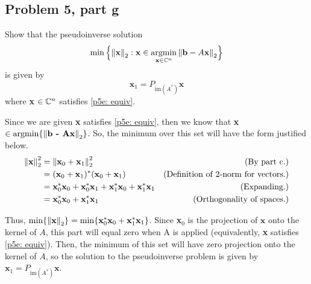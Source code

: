 \newpage
\subsection{Problem 5, part g}
Show that the pseudoinverse solution
\[
\min \Big\{ \norm{\textbf{x}}_2 : \textbf{x} \in \operatorname*{argmin}_{\textbf{x} \in \mathbb{C}^n}\norm{\textbf{b} - A\textbf{x}}_2\Big\}
\]
is given by
\[
\textbf{x}_1 = P_{\text{im}(A^*)}\textbf{x}
\]
where \textbf{x} $\in \mathbb{C}^n$ satisfies \ref{p5e: equiv}.

\partbreak
\begin{solution}

    Since we are given \textbf{x} satisfies \ref{p5e: equiv}, then we know that \textbf{x} $\in \operatorname*{argmin}\{ \norm{\textbf{b - A\textbf{x}}}_2\}$. So, the minimum over this set will have the form justified below.
    \alignbreak
    \begin{align}
        \norm{\textbf{x}}^2_2 &= \norm{\textbf{x}_0 + \textbf{x}_1}^2_2 &\text{(By part c.)}\nonumber\\
        &= (\textbf{x}_0 + \textbf{x}_1)^*(\textbf{x}_0 + \textbf{x}_1) &\text{(Definition of $2$-norm for vectors.)}\nonumber\\
        &= \textbf{x}_0^*\textbf{x}_0 + \textbf{x}_0^*\textbf{x}_1 + \textbf{x}_1^*\textbf{x}_0 + \textbf{x}_1^*\textbf{x}_1 &\text{(Expanding.)}\nonumber\\
        &= \textbf{x}_0^*\textbf{x}_0 + \textbf{x}_1^*\textbf{x}_1 &\text{(Orthogonality of spaces.)}\nonumber
    \end{align}
    \alignbreak

    Thus, $\min \{\norm{\textbf{x}}_2 \} = \min \{ \textbf{x}_0^*\textbf{x}_0 + \textbf{x}_1^*\textbf{x}_1 \}$. Since \textbf{x}$_0$ is the projection of $\textbf{x}$ onto the kernel of $A$, this part will equal zero when A is applied (equivalently, \textbf{x} satisfies \ref{p5e: equiv}). Then, the minimum of this set will have zero projection onto the kernel of $A$, so the solution to the pseudoinverse problem is given by $\textbf{x}_1 = P_{\text{im}(A^*)}\textbf{x}$.  
\end{solution}

\newpage
